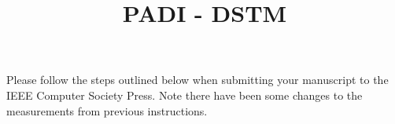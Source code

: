 \documentclass[times, 10pt,twocolumn]{article}
\begin{document}
\title{PADI - DSTM}



\maketitle
\thispagestyle{empty}



Please follow the steps outlined below when submitting your 
manuscript to the IEEE Computer Society Press. Note there have 
been some changes to the measurements from previous instructions. 
















\nocite{ex1,ex2}


\end{document}

